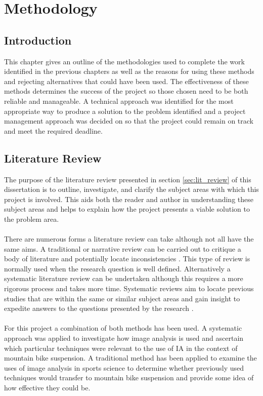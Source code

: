 \section{Methodology}\label{sec:methodology}
	\subsection{Introduction}
		This chapter gives an outline of the methodologies used to complete the work identified in the previous chapters as well as the reasons for using these methods and rejecting alternatives that could have been used. The effectiveness of these methods determines the success of the project so those chosen need to be both reliable and manageable. A technical approach was identified for the most appropriate way to produce a solution to the problem identified and a project management approach was decided on so that the project could remain on track and meet the required deadline.
	\subsection{Literature Review}
		The purpose of the literature review presented in section \ref{sec:lit_review} of this dissertation is to outline, investigate, and clarify the subject areas with which this project is involved. This aids both the reader and author in understanding these subject areas and helps to explain how the project presents a viable solution to the problem area.
		\\\\
		There are numerous forms a literature review can take although not all have the same aims. A traditional or narrative review can be carried out to critique a body of literature and potentially locate inconsistencies \citep{adams2007research}. This type of review is normally used when the research question is well defined. Alternatively a systematic literature review can be undertaken although this requires a more rigorous process and takes more time. Systematic reviews aim to locate previous studies that are within the same or similar subject areas and gain insight to expedite answers to the questions presented by the research \citep{kitchenham2009systematic}.
		\\\\
		For this project a combination of both methods has been used. A systematic approach was applied to investigate how image analysis is used and ascertain which particular techniques were relevant to the use of IA in the context of mountain bike suspension. A traditional method has been applied to examine the uses of image analysis in sports science to determine whether previously used techniques would transfer to mountain bike suspension and provide some idea of how effective they could be.
